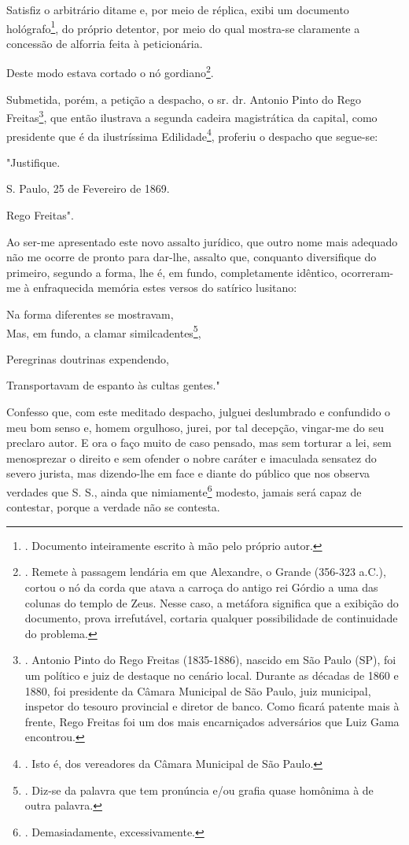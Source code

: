 Satisfiz o arbitrário ditame e, por meio de réplica, exibi um documento
hológrafo\footnote{. Documento inteiramente escrito à mão pelo próprio
  autor.}, do próprio detentor, por meio do qual mostra-se claramente a
concessão de alforria feita à peticionária.

Deste modo estava cortado o nó gordiano\footnote{. Remete à passagem
  lendária em que Alexandre, o Grande (356-323 a.C.), cortou o nó da
  corda que atava a carroça do antigo rei Górdio a uma das colunas do
  templo de Zeus. Nesse caso, a metáfora significa que a exibição do
  documento, prova irrefutável, cortaria qualquer possibilidade de
  continuidade do problema.}.

Submetida, porém, a petição a despacho, o sr. dr. Antonio Pinto do Rego
Freitas\footnote{. Antonio Pinto do Rego Freitas (1835-1886), nascido em
  São Paulo (SP), foi um político e juiz de destaque no cenário local.
  Durante as décadas de 1860 e 1880, foi presidente da Câmara Municipal
  de São Paulo, juiz municipal, inspetor do tesouro provincial e diretor
  de banco. Como ficará patente mais à frente, Rego Freitas foi um dos
  mais encarniçados adversários que Luiz Gama encontrou.}, que então
ilustrava a segunda cadeira magistrática da capital, como presidente que
é da ilustríssima Edilidade\footnote{. Isto é, dos vereadores da Câmara
  Municipal de São Paulo.}, proferiu o despacho que segue-se:

"Justifique.

S. Paulo, 25 de Fevereiro de 1869.

Rego Freitas".

Ao ser-me apresentado este novo assalto jurídico, que outro nome mais
adequado não me ocorre de pronto para dar-lhe, assalto que, conquanto
diversifique do primeiro, segundo a forma, lhe é, em fundo,
completamente idêntico, ocorreram-me à enfraquecida memória estes versos
do satírico lusitano:

Na forma diferentes se mostravam,\\
Mas, em fundo, a clamar similcadentes\footnote{. Diz-se da palavra que
  tem pronúncia e/ou grafia quase homônima à de outra palavra.},

Peregrinas doutrinas expendendo,

Transportavam de espanto às cultas gentes."

Confesso que, com este meditado despacho, julguei deslumbrado e
confundido o meu bom senso e, homem orgulhoso, jurei, por tal decepção,
vingar-me do seu preclaro autor. E ora o faço muito de caso pensado, mas
sem torturar a lei, sem menosprezar o direito e sem ofender o nobre
caráter e imaculada sensatez do severo jurista, mas dizendo-lhe em face
e diante do público que nos observa verdades que S. S., ainda que
nimiamente\footnote{. Demasiadamente, excessivamente.} modesto, jamais
será capaz de contestar, porque a verdade não se contesta.

